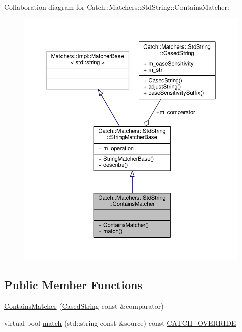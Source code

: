 Collaboration diagram for Catch\-:\-:Matchers\-:\-:Std\-String\-:\-:Contains\-Matcher\-:
\nopagebreak
\begin{figure}[H]
\begin{center}
\leavevmode
\includegraphics[width=350pt]{struct_catch_1_1_matchers_1_1_std_string_1_1_contains_matcher__coll__graph}
\end{center}
\end{figure}
\subsection*{Public Member Functions}
\begin{DoxyCompactItemize}
\item 
\hyperlink{struct_catch_1_1_matchers_1_1_std_string_1_1_contains_matcher_acc892883c8409e34b28c9b39d4ef1fe3}{Contains\-Matcher} (\hyperlink{struct_catch_1_1_matchers_1_1_std_string_1_1_cased_string}{Cased\-String} const \&comparator)
\item 
virtual bool \hyperlink{struct_catch_1_1_matchers_1_1_std_string_1_1_contains_matcher_ae4d567347fa563e365f1044f29ab1042}{match} (std\-::string const \&source) const \hyperlink{catch_8hpp_a8ecdce4d3f57835f707915ae831eb847}{C\-A\-T\-C\-H\-\_\-\-O\-V\-E\-R\-R\-I\-D\-E}
\end{DoxyCompactItemize}
